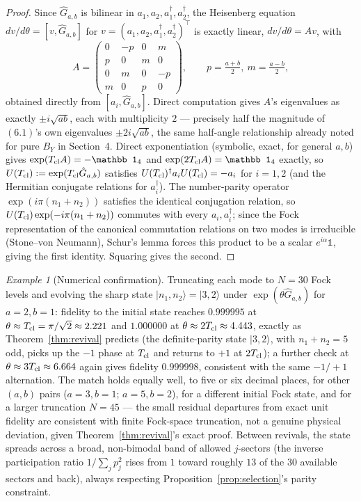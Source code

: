 \documentclass[11pt]{amsart}
\theoremstyle{remark}
\newtheorem*{example}{Example}
\begin{document}
\begin{proof}
Since $\hat G_{a,b}$ is bilinear in $a_1,a_2,a_1^\dagger,a_2^\dagger$, the Heisenberg equation $d v/d\theta=[v,\hat G_{a,b}]$ for $v=(a_1,a_2,a_1^\dagger,a_2^\dagger)^{\!\top}$ is exactly linear, $dv/d\theta=Av$, with
\[
A=\begin{pmatrix}0&-p&0&m\\ p&0&m&0\\ 0&m&0&-p\\ m&0&p&0\end{pmatrix},\qquad p=\tfrac{a+b}2,\ m=\tfrac{a-b}2,
\]
obtained directly from $[a_i,\hat G_{a,b}]$. Direct computation gives $A$'s eigenvalues as exactly $\pm i\sqrt{ab}$, each with multiplicity $2$ --- precisely half the magnitude of $(6.1)$'s own eigenvalues $\pm2i\sqrt{ab}$, the same half-angle relationship already noted for pure $B_Y$ in Section~4. Direct exponentiation (symbolic, exact, for general $a,b$) gives $\exp(T_{\rm cl}A)=-\mathbb 1_4$ and $\exp(2T_{\rm cl}A)=\mathbb 1_4$ exactly, so $U(T_{\rm cl}):=\exp(T_{\rm cl}\hat G_{a,b})$ satisfies $U(T_{\rm cl})^\dagger a_iU(T_{\rm cl})=-a_i$ for $i=1,2$ (and the Hermitian conjugate relations for $a_i^\dagger$). The number-parity operator $\exp(i\pi(n_1+n_2))$ satisfies the identical conjugation relation, so $U(T_{\rm cl})\exp(-i\pi(n_1+n_2))$ commutes with every $a_i,a_i^\dagger$; since the Fock representation of the canonical commutation relations on two modes is irreducible (Stone--von Neumann), Schur's lemma forces this product to be a scalar $e^{i\alpha}\mathbb1$, giving the first identity. Squaring gives the second.
\end{proof}

\begin{example}[Numerical confirmation]\label{ex:revival}
Truncating each mode to $N=30$ Fock levels and evolving the sharp state $|n_1,n_2\rangle=|3,2\rangle$ under $\exp(\theta\hat G_{a,b})$ for $a=2,b=1$: fidelity to the initial state reaches $0.999995$ at $\theta\approx T_{\rm cl}=\pi/\sqrt2\approx2.221$ and $1.000000$ at $\theta\approx2T_{\rm cl}\approx4.443$, exactly as Theorem~\ref{thm:revival} predicts (the definite-parity state $|3,2\rangle$, with $n_1+n_2=5$ odd, picks up the $-1$ phase at $T_{\rm cl}$ and returns to $+1$ at $2T_{\rm cl}$); a further check at $\theta\approx3T_{\rm cl}\approx6.664$ again gives fidelity $0.999998$, consistent with the same $-1/+1$ alternation. The match holds equally well, to five or six decimal places, for other $(a,b)$ pairs ($a{=}3,b{=}1$; $a{=}5,b{=}2$), for a different initial Fock state, and for a larger truncation $N=45$ --- the small residual departures from exact unit fidelity are consistent with finite Fock-space truncation, not a genuine physical deviation, given Theorem~\ref{thm:revival}'s exact proof. Between revivals, the state spreads across a broad, non-bimodal band of allowed $j$-sectors (the inverse participation ratio $1/\sum_jp_j^2$ rises from $1$ toward roughly $13$ of the $30$ available sectors and back), always respecting Proposition~\ref{prop:selection}'s parity constraint.
\end{example}
\end{document}
